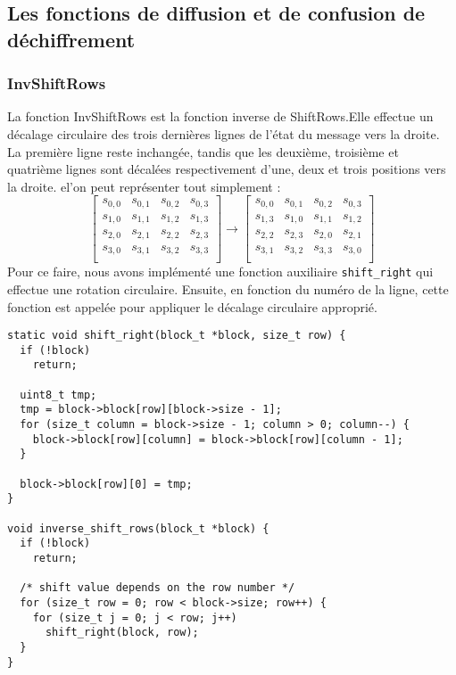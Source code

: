 \documentclass[a4paper, 10pt]{article}
\begin{document}
  \subsection{Les fonctions de diffusion et de confusion de déchiffrement}
  \subsubsection{InvShiftRows}
  La fonction InvShiftRows est la fonction inverse de ShiftRows.Elle effectue un décalage circulaire des trois dernières lignes de l’état du message vers la droite. 
  La première ligne reste inchangée, tandis que les deuxième, troisième et quatrième lignes sont décalées respectivement d'une, deux 
  et trois positions vers la droite. el’on peut représenter tout simplement :
  \[
    \begin{bmatrix}
      s_{0,0}&s_{0,1}& s_{0,2}&s_{0,3}\\
      s_{1,0}&s_{1,1}& s_{1,2}&s_{1,3}\\
      s_{2,0}&s_{2,1}& s_{2,2}&s_{2,3}\\
      s_{3,0}&s_{3,1}& s_{3,2}&s_{3,3}\\
    \end{bmatrix}
    \rightarrow
    \begin{bmatrix}
      s_{0,0}&s_{0,1}& s_{0,2}&s_{0,3}\\
      s_{1,3}&s_{1,0}&s_{1,1}& s_{1,2}\\
      s_{2,2}&s_{2,3}& s_{2,0}&s_{2,1}\\
      s_{3,1}&s_{3,2}& s_{3,3}&s_{3,0}\\
    \end{bmatrix}
  \]
  Pour ce faire, nous avons implémenté une fonction auxiliaire \texttt{shift\_right} qui effectue une rotation circulaire. 
  Ensuite, en fonction du numéro de la ligne, cette fonction est appelée pour appliquer le décalage circulaire approprié.

\small{
\begin{verbatim}
static void shift_right(block_t *block, size_t row) {
  if (!block)
    return;

  uint8_t tmp;
  tmp = block->block[row][block->size - 1];
  for (size_t column = block->size - 1; column > 0; column--) {
    block->block[row][column] = block->block[row][column - 1];
  }

  block->block[row][0] = tmp;
}

void inverse_shift_rows(block_t *block) {
  if (!block)
    return;

  /* shift value depends on the row number */
  for (size_t row = 0; row < block->size; row++) {
    for (size_t j = 0; j < row; j++)
      shift_right(block, row);
  }
}

\end{verbatim}
}
\end{document}
